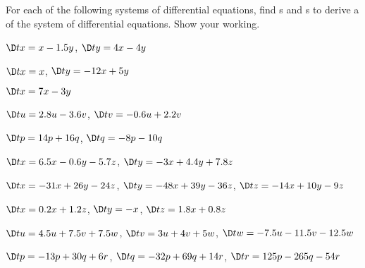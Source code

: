 \begin{exercise}  
For each of the following systems of differential equations, find s and s to derive a  of the system of differential equations.  Show your working.

\begin{Parts}
\item \(\D tx=x-1.5y\), \(\D ty=4x-4y\)

\item \(\D tx=x\), \(\D ty=-12x+5y\)

\item \(\D tx=7x-3y\)

\begin{reduce}
\item \(\D tu=2.8u-3.6v\), \(\D tv=-0.6u+2.2v\)

\item \(\D tp=14p+16q\), \(\D tq=-8p-10q\)

\item \(\D tx=6.5x-0.6y-5.7z\), \(\D ty=-3x+4.4y+7.8z\)%

\item \(\D tx=-31x+26y-24z\), \(\D ty=-48x+39y-36z\), \(\D tz=-14x+10y-9z\)
\end{reduce}

\item \(\D tx=0.2x+1.2z\), \(\D ty=-x\), \(\D tz=1.8x+0.8z\)

\item \(\D tu=4.5u+7.5v+7.5w\), \(\D tv=3u+4v+5w\), \(\D tw=-7.5u-11.5v-12.5w\)

\item \(\D tp=-13p+30q+6r\), \(\D tq=-32p+69q+14r\), \(\D tr=125p-265q-54r\)

\end{Parts}
\end{exercise}





